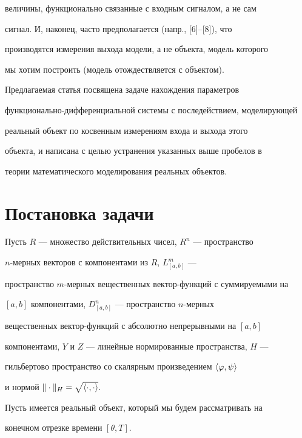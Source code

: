 величины, функционально связанные с входным сигналом, а не сам


сигнал. И, наконец, часто предполагается (напр., [6]--[8]), что


производятся измерения выхода модели, а не объекта, модель которого


мы хотим построить (модель отождествляется с объектом).





Предлагаемая статья посвящена задаче нахождения параметров


функционально-диффе\-рен\-циальной системы с последействием, моделирующей


реальный объект по косвенным измерениям входа и выхода этого


объекта, и написана с целью устранения указанных выше пробелов в


теории математического моделирования реальных объектов.





\section{Постановка задачи}





Пусть $R$ --- множество действительных чисел, $R^n$ --- пространство


$n$-мерных векторов с компонентами из $R$, $L^m_{[a,b]}$ ---


пространство $m$-мерных вещественных вектор-функций с суммируемыми на


$[a,b]$ компонентами, $D^n_{[a,b]}$ --- пространство $n$-мерных


вещественных вектор-функций с абсолютно непрерывными на $[a,b]$


компонентами, $Y$ и $Z$ --- линейные нормированные пространства, $H$ ---


гильбертово пространство со скалярным произведением $\langle \varphi,\psi\rangle $


и нормой $\|\cdot\|_H=\sqrt{\langle \cdot,\cdot\rangle }.$





Пусть имеется реальный объект, который мы будем рассматривать на


конечном отрезке времени $[\theta,T].$





